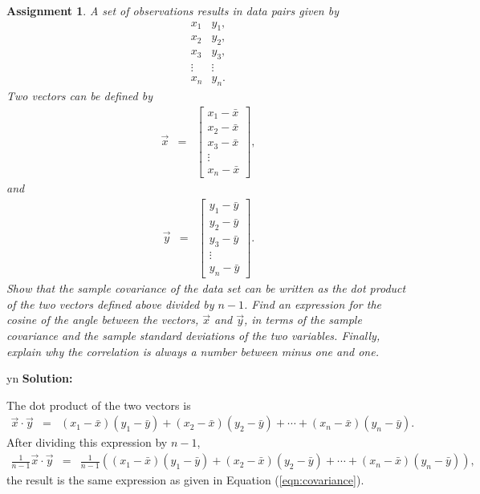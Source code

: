 \documentclass[12pt]{article}
\def\solutions{y}
\def\solutions{n}
\newtheorem{assignment}{Assignment}[section]
\newcommand{\lp}{\left(}
\newcommand{\rp}{\right)}
\begin{document}
\begin{assignment}
  A set of observations results in data pairs given by
  \begin{eqnarray*}
    x_1 & y_1, \\
    x_2 & y_2, \\
    x_3 & y_3, \\
    \vdots & \vdots \\
    x_n & y_n.
  \end{eqnarray*}
  Two vectors can be defined by
  \begin{eqnarray*}
    \vec{x} & = & 
    \left[
      \begin{array}{c}
        x_1 - \bar{x} \\
        x_2 - \bar{x} \\
        x_3 - \bar{x} \\
        \vdots \\
        x_n - \bar{x}
      \end{array}
      \right],
  \end{eqnarray*}
  and
  \begin{eqnarray*}
    \vec{y} & = & 
    \left[
      \begin{array}{c}
        y_1 - \bar{y} \\
        y_2 - \bar{y} \\
        y_3 - \bar{y} \\
        \vdots \\
        y_n - \bar{y}
      \end{array}
      \right].
  \end{eqnarray*}
  Show that the sample covariance of the data set can be written as
  the dot product of the two vectors defined above divided by $n-1$.
  Find an expression for the cosine of the angle between the vectors,
  $\vec{x}$ and $\vec{y}$, in terms of the sample covariance and the
  sample standard deviations of the two variables. Finally, explain
  why the correlation is always a number between minus one and one.
\end{assignment}

\if y\solutions
\textbf{Solution:} 

The dot product of the two vectors is
\begin{eqnarray*}
  \vec{x}\cdot\vec{y} & = & (x_1-\bar{x})(y_1-\bar{y}) +
  (x_2-\bar{x})(y_2-\bar{y}) + \cdots + (x_n-\bar{x})(y_n-\bar{y}).
\end{eqnarray*}
After dividing this expression by $n-1$,
\begin{eqnarray*}
  \frac{1}{n-1} \vec{x}\cdot\vec{y} & = & 
  \frac{1}{n-1} \lp (x_1-\bar{x})(y_1-\bar{y}) +
  (x_2-\bar{x})(y_2-\bar{y}) + \cdots + (x_n-\bar{x})(y_n-\bar{y}) \rp, 
\end{eqnarray*}
the result is the same expression as given in Equation
(\ref{eqn:covariance}).
\end{document}
